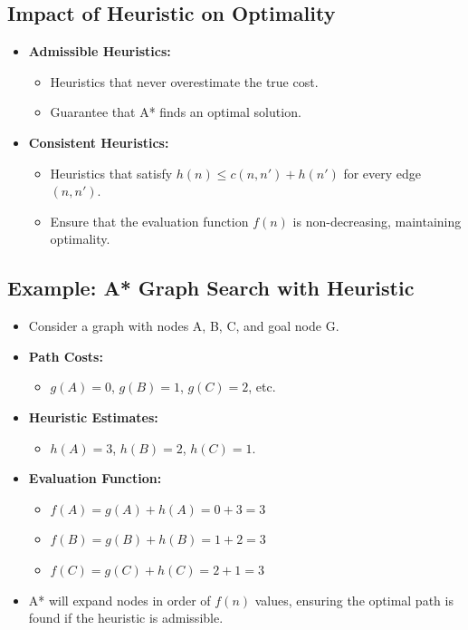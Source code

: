 \documentclass[8pt]{article}
\begin{document}
\subsection*{Impact of Heuristic on Optimality}
\begin{itemize}
    \item \textbf{Admissible Heuristics:}
    \begin{itemize}
        \item Heuristics that never overestimate the true cost.
        \item Guarantee that A* finds an optimal solution.
    \end{itemize}
    \item \textbf{Consistent Heuristics:}
    \begin{itemize}
        \item Heuristics that satisfy \( h(n) \leq c(n, n') + h(n') \) for every edge \( (n, n') \).
        \item Ensure that the evaluation function \( f(n) \) is non-decreasing, maintaining optimality.
    \end{itemize}
\end{itemize}

\subsection*{Example: A* Graph Search with Heuristic}
\begin{itemize}
    \item Consider a graph with nodes A, B, C, and goal node G.
    \item \textbf{Path Costs:} 
    \begin{itemize}
        \item \( g(A) = 0 \), \( g(B) = 1 \), \( g(C) = 2 \), etc.
    \end{itemize}
    \item \textbf{Heuristic Estimates:}
    \begin{itemize}
        \item \( h(A) = 3 \), \( h(B) = 2 \), \( h(C) = 1 \).
    \end{itemize}
    \item \textbf{Evaluation Function:} 
    \begin{itemize}
        \item \( f(A) = g(A) + h(A) = 0 + 3 = 3 \)
        \item \( f(B) = g(B) + h(B) = 1 + 2 = 3 \)
        \item \( f(C) = g(C) + h(C) = 2 + 1 = 3 \)
    \end{itemize}
    \item A* will expand nodes in order of \( f(n) \) values, ensuring the optimal path is found if the heuristic is admissible.
\end{itemize}
\end{document}

